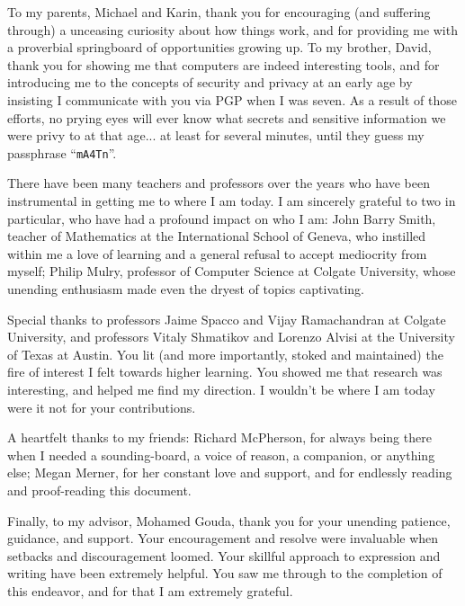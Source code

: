 To my parents, Michael and Karin, thank you for encouraging (and suffering through) a unceasing curiosity about how things work,
    and for providing me with a proverbial springboard of opportunities growing up.
To my brother, David, thank you for showing me that computers are indeed interesting tools,
    and for introducing me to the concepts of security and privacy at an early age
    by insisting I communicate with you via PGP when I was seven.
As a result of those efforts, no prying eyes will ever know what secrets and sensitive information we were privy to at that age...
    at least for several minutes, until they guess my passphrase ``\texttt{mA4Tn}''.

There have been many teachers and professors over the years who have been instrumental in getting me to where I am today.
I am sincerely grateful to two in particular, who have had a profound impact on who I am:
    John Barry Smith, teacher of Mathematics at the International School of Geneva,
        who instilled within me a love of learning and a general refusal to accept mediocrity from myself;
    Philip Mulry, professor of Computer Science at Colgate University,
        whose unending enthusiasm made even the dryest of topics captivating.

Special thanks to professors Jaime Spacco and Vijay Ramachandran at Colgate University,
    and professors Vitaly Shmatikov and Lorenzo Alvisi at the University of Texas at Austin.
You lit (and more importantly, stoked and maintained) the fire of interest I felt towards higher learning.
You showed me that research was interesting, and helped me find my direction.
I wouldn't be where I am today were it not for your contributions.

A heartfelt thanks to my friends:
    Richard McPherson, for always being there when I needed a sounding-board, a voice of reason, a companion, or anything else;
    Megan Merner, for her constant love and support, and for endlessly reading and proof-reading this document.

Finally, to my advisor, Mohamed Gouda, thank you for your unending patience, guidance, and support.
Your encouragement and resolve were invaluable when setbacks and discouragement loomed.
Your skillful approach to expression and writing have been extremely helpful.
You saw me through to the completion of this endeavor, and for that I am extremely grateful.
